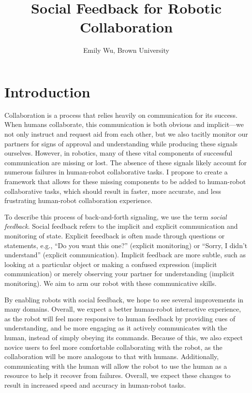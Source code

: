 \documentclass{article}
\title{Social Feedback for Robotic Collaboration}
\author{Emily Wu, Brown University}
\begin{document}
\maketitle

\section{Introduction}

Collaboration is a process that relies heavily on communication for its success. When humans collaborate, this communication is both obvious and implicit---we not only instruct and request aid from each other, but we also tacitly monitor our partners for signs of approval and understanding while producing these signals ourselves. However, in robotics, many of these vital components of successful communication are missing or lost. The absence of these signals likely account for numerous failures in human-robot collaborative tasks. I propose to create a framework that allows for these missing components to be added to human-robot collaborative tasks, which should result in faster, more accurate, and less frustrating human-robot collaboration experience. 

To describe this process of back-and-forth signaling, we use the term \emph{social feedback}. Social feedback refers to the implicit and explicit communication and monitoring of state. Explicit feeedback is often made through questions or statements, e.g., ``Do you want this one?'' (explicit monitoring) or ``Sorry, I didn't understand'' (explicit communication). Implicit feedback are more subtle, such as looking at a particular object or making a confused expression (implicit communication) or merely observing your partner for understanding (implicit monitoring). We aim to arm our robot with these communicative skills. 

By enabling robots with social feedback, we hope to see several improvements in many domains. Overall, we expect a better human-robot interactive experience, as the robot will feel more responsive to human feedback by providing cues of understanding, and be more engaging as it actively communicates with the human, instead of simply obeying its commands. Because of this, we also expect novice users to feel more comfortable collaborating with the robot, as the collaboration will be more analogous to that with humans. Additionally, communicating with the human will allow the robot to use the human as a resource to help it recover from failures. Overall, we expect these changes to result in increased speed and accuracy in human-robot tasks. 
\end{document}
